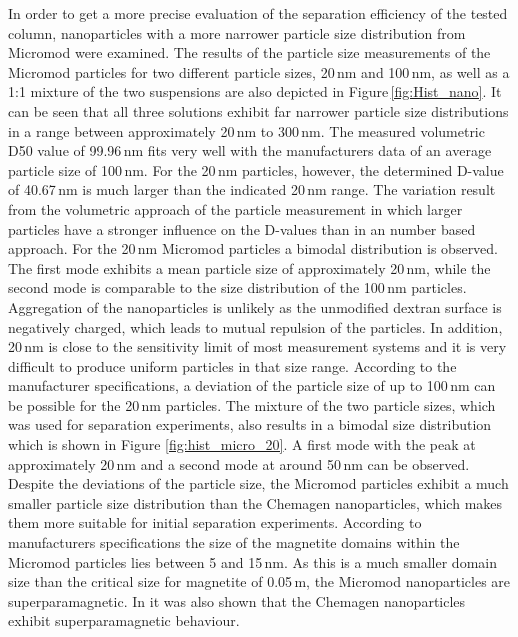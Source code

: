 In order to get a more precise evaluation of the separation efficiency of the tested column, nanoparticles with a more narrower particle size distribution from Micromod were examined. The results of the particle size measurements of the Micromod particles for two different particle sizes, 20\,nm and 100\,nm, as well as a 1:1 mixture of the two suspensions are also depicted in Figure\,\ref{fig:Hist_nano}. It can be seen that all three solutions exhibit far narrower particle size distributions in a range between approximately 20\,nm to 300\,nm. The measured volumetric D50 value of 99.96\,nm fits very well with the manufacturers data of an average particle size of 100\,nm. For the 20\,nm particles, however, the determined D-value of 40.67\,nm is much larger than the indicated 20\,nm range. The variation result from the volumetric approach of the particle measurement in which larger particles have a stronger influence on the D-values than in an number based approach. For the 20\,nm Micromod particles a bimodal distribution is observed. The first mode exhibits a mean particle size of approximately 20\,nm, while the second mode is comparable to the size distribution of the 100\,nm particles. Aggregation of the nanoparticles is unlikely as the unmodified dextran surface is negatively charged, which leads to mutual repulsion of the particles. In addition, 20\,nm is close to the sensitivity limit of most measurement systems and it is very difficult to produce uniform particles in that size range. According to the manufacturer specifications, a deviation of the particle size of up to 100\,nm can be possible for the 20\,nm particles. The mixture of the two particle sizes, which was used for separation experiments, also results in a bimodal size distribution which is shown in Figure \ref{fig:hist_micro_20}. A first mode with the peak at approximately 20\,nm and a second mode at around 50\,nm can be observed. Despite the deviations of the particle  size, the Micromod particles exhibit a much smaller particle size distribution than the Chemagen nanoparticles, which makes them more suitable for initial separation experiments. According to manufacturers specifications the size of the magnetite domains within the Micromod particles lies between 5 and 15\,nm. As this is a much smaller domain size than the critical size for magnetite of 0.05\,\textmu m, the Micromod nanoparticles are superparamagnetic. In \cite{AndreMaster} it was also shown that the Chemagen nanoparticles exhibit superparamagnetic behaviour. 

